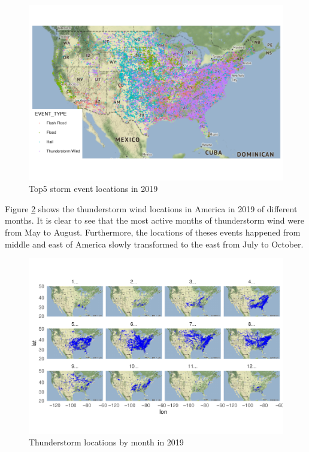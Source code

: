 \documentclass[
]{article}
\begin{document}
\begin{figure}

{\centering \includegraphics{Images/locationmap-1} 

}

\caption{Top5 storm event locations in 2019}\label{fig:locationmap}
\end{figure}

\clearpage

Figure \ref{fig:TWmonth} shows the thunderstorm wind locations in America in 2019 of different months. It is clear to see that the most active months of thunderstorm wind were from May to August. Furthermore, the locations of theses events happened from middle and east of America slowly transformed to the east from July to October.

\begin{figure}

{\centering \includegraphics{Images/TWmonth-1} 

}

\caption{Thunderstorm locations by month in 2019}\label{fig:TWmonth}
\end{figure}
\end{document}
